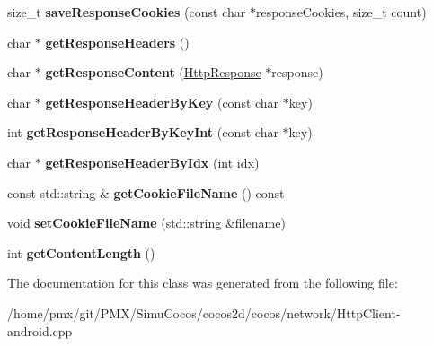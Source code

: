 \begin{DoxyCompactItemize}
size\+\_\+t {\bfseries save\+Response\+Cookies} (const char $\ast$response\+Cookies, size\+\_\+t count)
\item 
\mbox{\label{classnetwork_1_1HttpURLConnection_a2c2b751aacec3db9b9bda538a67337f9}} 
char $\ast$ {\bfseries get\+Response\+Headers} ()
\item 
\mbox{\label{classnetwork_1_1HttpURLConnection_aab13dc49babadc46b57d019f7a786c20}} 
char $\ast$ {\bfseries get\+Response\+Content} (\hyperlink{classnetwork_1_1HttpResponse}{Http\+Response} $\ast$response)
\item 
\mbox{\label{classnetwork_1_1HttpURLConnection_a96c181fa254daaffdb4e9336763a71c5}} 
char $\ast$ {\bfseries get\+Response\+Header\+By\+Key} (const char $\ast$key)
\item 
\mbox{\label{classnetwork_1_1HttpURLConnection_acc47cc640f30ff93e3d5d1f9ba5560d0}} 
int {\bfseries get\+Response\+Header\+By\+Key\+Int} (const char $\ast$key)
\item 
\mbox{\label{classnetwork_1_1HttpURLConnection_a47000e2aa054a0ffe633fec4082839cb}} 
char $\ast$ {\bfseries get\+Response\+Header\+By\+Idx} (int idx)
\item 
\mbox{\label{classnetwork_1_1HttpURLConnection_a8b2c2de1bbafbbe6a18607b3ace7a822}} 
const std\+::string \& {\bfseries get\+Cookie\+File\+Name} () const
\item 
\mbox{\label{classnetwork_1_1HttpURLConnection_a9679dadee623ce15aaa17ad19bf29e87}} 
void {\bfseries set\+Cookie\+File\+Name} (std\+::string \&filename)
\item 
\mbox{\label{classnetwork_1_1HttpURLConnection_abaf206652881eabba7b5b938be4d0da2}} 
int {\bfseries get\+Content\+Length} ()
\end{DoxyCompactItemize}


The documentation for this class was generated from the following file\+:\begin{DoxyCompactItemize}
\item 
/home/pmx/git/\+P\+M\+X/\+Simu\+Cocos/cocos2d/cocos/network/Http\+Client-\/android.\+cpp\end{DoxyCompactItemize}
